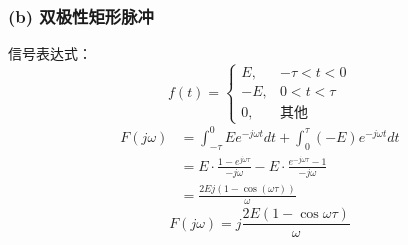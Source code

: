 \subsubsection{(b) 双极性矩形脉冲}
信号表达式：
\[
f(t) =
\begin{cases}
E, & -\tau < t < 0 \\
-E, & 0 < t < \tau \\
0, & \text{其他}
\end{cases}
\]
\[
\begin{aligned}
F(j\omega) &= \int_{-\tau}^0 E e^{-j\omega t}dt + \int_0^\tau (-E) e^{-j\omega t}dt \\
&= E\cdot\frac{1-e^{j\omega\tau}}{-j\omega} - E\cdot\frac{e^{-j\omega\tau}-1}{-j\omega} \\
&= \frac{2E j(1-\cos(\omega\tau))}{\omega}
\end{aligned}
\]
\[
\boxed{F(j\omega) = j\frac{2E(1-\cos\omega\tau)}{\omega}}
\]